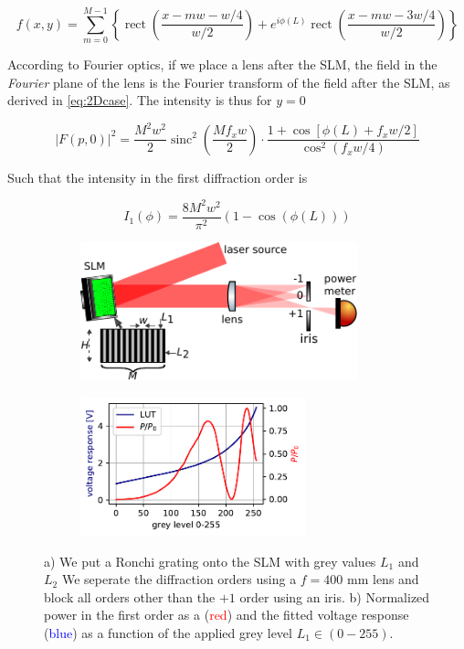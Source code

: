 \begin{equation}\label{eq:FieldAfterSLM}
    f(x,y) = \sum_{m=0}^{M-1} \left\{
    \operatorname{rect}\left(\frac{x-m w - w/4}{w/2}\right) + e^{i \phi(L)} \operatorname{rect}\left(\frac{x - m w - 3 w/4}{w/2}\right)
    \right\}
\end{equation}

According to Fourier optics, if we place a lens after the SLM, the field in the \textit{Fourier} plane of the lens is the Fourier transform of the field after the SLM, as derived in \cref{eq:2Dcase}. The intensity is thus for $y=0$

\begin{equation}\label{eq:FourierIntensity}
    |F(p,0)|^2=
    \frac{M^2 w^2}{2}\operatorname{sinc}^2\left(\frac{M f_x w}{2}\right) \cdot
    \frac{1 + \cos{\left[\phi(L)+f_x w/2\right]}}{\cos^2(f_x w/4)}
\end{equation}

Such that the intensity in the first diffraction order is

\begin{equation}\label{eq:IntensityFirstOrder}
    I_1(\phi) =
    \frac{8M^2w^2}{\pi^2} \left( 
    1-\cos{(\phi(L))}
    \right)
\end{equation}

\begin{figure}
	\begin{subfigure}{.54\linewidth}
		\includegraphics[height=4cm]{figures/LUTcalibrationSetup.pdf}
		\caption{}
		\label{fig:RonchiGrating}
	\end{subfigure}
	\hfill
	\begin{subfigure}{.44\linewidth}
		\includegraphics[height=4cm]{figures/lut_plot.pdf}
		\caption{}
		\label{fig:LUTcalibration}
	\end{subfigure}
	\caption{a) We put a Ronchi grating onto the SLM with grey values $L_1$ and $L_2$ We seperate the diffraction orders using a $f=400$ mm lens and block all orders other than the $+1$ order using an iris. b) Normalized power in the first order as a (\textcolor{red}{red}) and the fitted voltage response (\textcolor{blue}{blue}) as a function of the applied grey level $L_1 \in (0-255)$.}
	\label{fig:GerschbergSaxton}
\end{figure}

